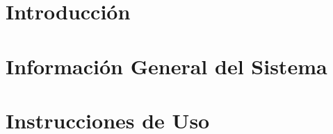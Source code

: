 \documentclass[11pt, a4paper, twoside]{report}
\begin{document}



\clearpage
\begingroup
  \makeatletter
  \let\ps@plain\ps@empty
  \makeatother
  
  \pagestyle{empty} %
  \tableofcontents
  \clearpage
\endgroup

\pagestyle{fancy}    %
\setcounter{page}{1} %

\setcounter{page}{1}

\chapter{Introducción}

\chapter{Información General del Sistema}

\chapter{Instrucciones de Uso}

\end{document}
